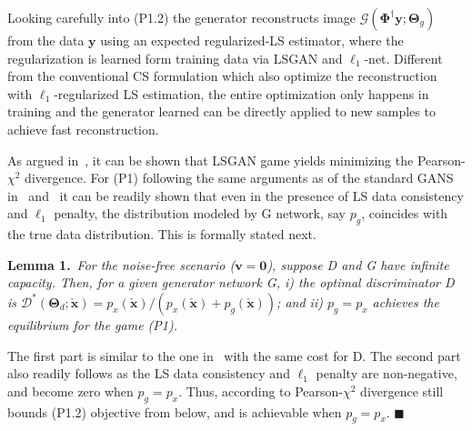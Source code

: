 \documentclass{journal}
\def \cD {\mathcal{D}}
\def \cG {\mathcal{G}}
\def \bPhi {\boldsymbol{\Phi}}
\def \bTheta {\boldsymbol{\Theta}}
\def \by {\mathbf{y}}
\def \bx {\mathbf{x}}
\def \bv {\mathbf{v}}
\begin{document}
Looking carefully into (P1.2) the generator reconstructs image $\cG(\bPhi^{\dagger} \by; \bTheta_g)$ from the data $\by$ using an expected regularized-LS estimator, where the regularization is learned form training data via LSGAN and $\ell_1$-net. Different from the conventional CS formulation which also optimize the reconstruction with $\ell_1$-regularized LS estimation, the entire optimization only happens in training and the generator learned can be directly applied to new samples to achieve fast reconstruction.

As argued in~\cite{lsgan2017}, it can be shown that LSGAN game yields minimizing the Pearson-$\chi^2$ divergence. For (P1) following the same arguments as of the standard GANS in~\cite{gan-goodfellow2014} and~\cite{lsgan2017} it can be readily shown that even in the presence of LS data consistency and $\ell_1$ penalty, the distribution modeled by G network, say $p_g$, coincides with the true data distribution. This is formally stated next.

\noindent\textbf{Lemma 1.}~{\it For the noise-free scenario ($\bv=\mathbf{0}$), suppose D and G have infinite capacity. Then, for a given generator network G, i) the optimal discriminator D is $\cD^{*}(\bTheta_d;\check{\bx})=p_x(\check{\bx})/(p_x(\check{\bx})+p_g(\check{\bx}))$; and ii) $p_g=p_x$ achieves the equilibrium for the game (P1). }

 The first part is similar to the one in~\cite{lsgan2017} with the same cost for D. The second part also readily follows as the LS data consistency and $\ell_1$ penalty are non-negative, and become zero when $p_g=p_x$. Thus, according to Pearson-$\chi^2$ divergence still bounds (P1.2) objective from below, and is achievable when $p_g=p_x$. $\blacksquare$







%
%
%
%
%
\end{document}
